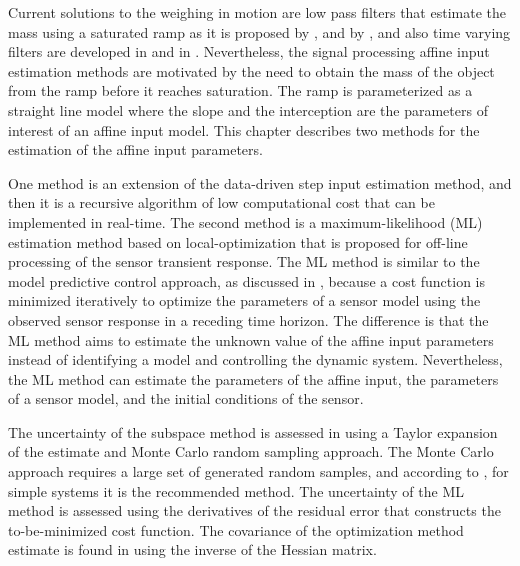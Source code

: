 Current solutions to the weighing in motion are low pass filters that estimate the mass using a saturated ramp as it is proposed by \citet{Tasaki07}, and by \citet{Niedzwiecki16b}, and also time varying filters are developed in \citet{Piskorowski08} and in \citet{Pietrzak14}.
Nevertheless, the signal processing affine input estimation methods are motivated by the need to obtain the mass of the object from the ramp before it reaches saturation.
The ramp is parameterized as a straight line model where the slope and the interception are the parameters of interest of an affine input model.
This chapter describes two methods for the estimation of the affine input parameters.

One method is an extension of the data-driven step input estimation method, and then it is a recursive algorithm of low computational cost that can be implemented in real-time.
The second method is a maximum-likelihood (ML) estimation method based on local-optimization that is proposed for off-line processing of the sensor transient response.
The ML method is similar to the model predictive control approach, as discussed in \cite{Mayne14}, because a cost function is minimized iteratively to optimize the parameters of a sensor model using the observed sensor response in a receding time horizon.
The difference is that the ML method aims to estimate the unknown value of the affine input parameters instead of identifying a model and controlling the dynamic system.
Nevertheless, the ML method can estimate the parameters of the affine input, the parameters of a sensor model, and the initial conditions of the sensor.

The uncertainty of the subspace method is assessed in \cite{QuintanaCSDA} using a Taylor expansion of the estimate and Monte Carlo random sampling approach.
The Monte Carlo approach requires a large set of generated random samples, and according to \citet{Cox06}, for simple systems it is the recommended method.
The uncertainty of the ML method is assessed using the derivatives of the residual error that constructs the to-be-minimized cost function.
The covariance of the optimization method estimate is found in \cite{Pintelon12Book} using the inverse of the Hessian matrix.
\color{black}

